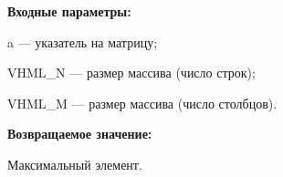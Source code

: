 \textbf{Входные параметры:}

 a --- указатель на матрицу;
 
 VHML\_N --- размер массива (число строк);
 
 VHML\_M --- размер массива (число столбцов).

\textbf{Возвращаемое значение:}

 Максимальный элемент.